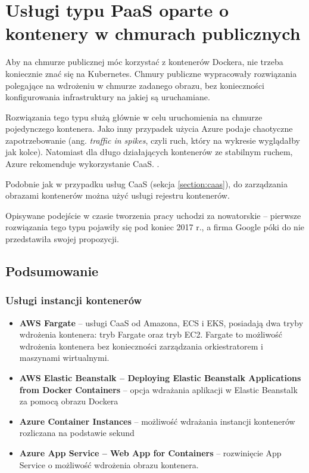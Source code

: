 \documentclass[12pt,a4paper,twoside,titlepage,openright]{book}
\begin{document}
\section{Usługi typu PaaS oparte o kontenery w chmurach publicznych}

Aby na chmurze publicznej móc korzystać z kontenerów Dockera, nie trzeba koniecznie znać się na Kubernetes. Chmury publiczne wypracowały rozwiązania polegające na wdrożeniu w chmurze zadanego obrazu, bez konieczności konfigurowania infrastruktury na jakiej są uruchamiane.

Rozwiązania tego typu służą głównie w celu uruchomienia na chmurze pojedynczego kontenera. Jako inny przypadek użycia Azure podaje chaotyczne zapotrzebowanie (ang. \textit{traffic in spikes}, czyli ruch, który na wykresie wyglądałby jak kolce). Natomiast dla długo działających kontenerów ze stabilnym ruchem, Azure rekomenduje wykorzystanie CaaS. \cite{siteAzureContainerInstances}.

Podobnie jak w przypadku usług CaaS (sekcja \ref{section:caas}), do zarządzania obrazami kontenerów można użyć usługi rejestru kontenerów.

Opisywane podejście w czasie tworzenia pracy uchodzi za nowatorskie -- pierwsze rozwiązania tego typu pojawiły się pod koniec 2017 r., a firma Google póki do nie przedstawiła swojej propozycji.

\subsection*{Podsumowanie}

\subsubsection{Usługi instancji kontenerów}

\begin{itemize}
\item \textbf{AWS Fargate} -- usługi CaaS od Amazona, ECS i EKS, posiadają dwa tryby wdrożenia kontenera: tryb Fargate oraz tryb EC2. Fargate to możliwość wdrożenia kontenera bez konieczności zarządzania orkiestratorem i maszynami wirtualnymi. \cite{siteAwsFargate}
\item \textbf{AWS Elastic Beanstalk -- Deploying Elastic Beanstalk Applications from Docker Containers} -- opcja wdrażania aplikacji w Elastic Beanstalk za pomocą obrazu Dockera 
\item \textbf{Azure Container Instances} -- możliwość wdrażania instancji kontenerów rozliczana na podstawie sekund \cite{siteAzureContainerInstances}
\item \textbf{Azure App Service -- Web App for Containers} -- rozwinięcie App Service o możliwość wdrożenia obrazu kontenera.
\end{itemize}
\end{document}
